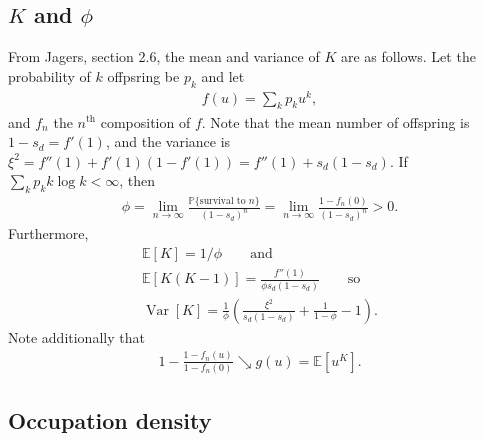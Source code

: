 \documentclass{article}
\newcommand{\E}{\mathbb{E}}
\renewcommand{\P}{\mathbb{P}}
\newcommand{\var}{\mathop{\mbox{Var}}}
\begin{document}
\subsection{$K$ and $\phi$}

From Jagers, section 2.6,
the mean and variance of $K$ are as follows.
Let the probability of $k$ offpsring be $p_k$ and let
\begin{align}
 f(u) =  \sum_k p_k u^k,
\end{align}
and $f_n$ the $n^\mathrm{th}$ composition of $f$.
Note that the mean number of offspring is $1-s_d = f'(1)$, and the variance is $\xi^2 = f''(1) + f'(1)(1-f'(1)) = f''(1) + s_d(1-s_d)$.
If $\sum_k p_k k \log k < \infty$, then 
\begin{align}
\phi = \lim_{n \to \infty} \frac{ \P\{ \mbox{survival to }n \}  }{ (1-s_d)^n } = \lim_{n \to \infty} \frac{ 1-f_n(0) }{ (1-s_d)^n } > 0 .
\end{align}
Furthermore,
\begin{gather*}
\E[K] = 1/\phi \qquad \mbox{and} \\
\E[K(K-1)] = \frac{ f''(1) }{ \phi s_d (1-s_d) } \qquad \mbox{so} \\
\var[K] = \frac{1}{\phi} \left( \frac{ \xi^2 }{ s_d (1-s_d) } + \frac{1}{1-\phi} - 1 \right) .
\end{gather*}
Note additionally that 
\begin{align}
    1 - \frac{1-f_n(u)}{1-f_n(0)} \searrow g(u) = \E[u^K] .
\end{align}

\subsection{Occupation density}
\end{document}
